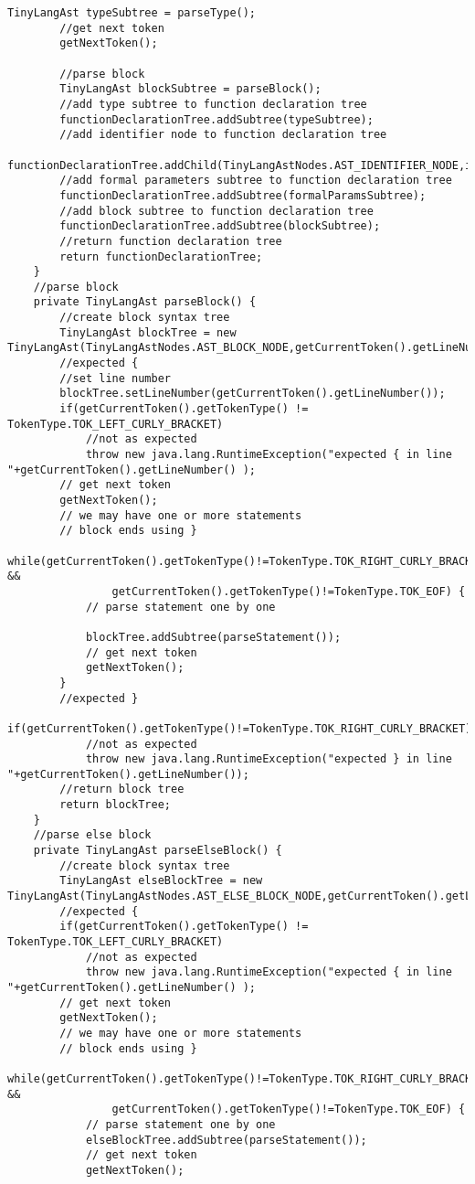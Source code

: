 \begin{lstlisting}[basicstyle=\miniscule,caption=Implementation of recursive descent parser,label=listing:rescursive descent parser implementation]
		TinyLangAst typeSubtree = parseType();
		//get next token
		getNextToken();

		//parse block
		TinyLangAst blockSubtree = parseBlock();
		//add type subtree to function declaration tree
		functionDeclarationTree.addSubtree(typeSubtree);
		//add identifier node to function declaration tree
		functionDeclarationTree.addChild(TinyLangAstNodes.AST_IDENTIFIER_NODE,identifier.getLexeme(),identifier.getLineNumber());
		//add formal parameters subtree to function declaration tree
		functionDeclarationTree.addSubtree(formalParamsSubtree);
		//add block subtree to function declaration tree
		functionDeclarationTree.addSubtree(blockSubtree);
		//return function declaration tree
		return functionDeclarationTree;
	}
	//parse block
	private TinyLangAst parseBlock() {
		//create block syntax tree
		TinyLangAst blockTree = new TinyLangAst(TinyLangAstNodes.AST_BLOCK_NODE,getCurrentToken().getLineNumber());
		//expected {
		//set line number 
		blockTree.setLineNumber(getCurrentToken().getLineNumber());
		if(getCurrentToken().getTokenType() != TokenType.TOK_LEFT_CURLY_BRACKET) 
			//not as expected
			throw new java.lang.RuntimeException("expected { in line "+getCurrentToken().getLineNumber() );
		// get next token
		getNextToken();
		// we may have one or more statements
		// block ends using }
		while(getCurrentToken().getTokenType()!=TokenType.TOK_RIGHT_CURLY_BRACKET &&
				getCurrentToken().getTokenType()!=TokenType.TOK_EOF) {
			// parse statement one by one

			blockTree.addSubtree(parseStatement());
			// get next token
			getNextToken();
		}
		//expected }
		if(getCurrentToken().getTokenType()!=TokenType.TOK_RIGHT_CURLY_BRACKET) 
			//not as expected
			throw new java.lang.RuntimeException("expected } in line "+getCurrentToken().getLineNumber());
		//return block tree
		return blockTree;
	}
	//parse else block
	private TinyLangAst parseElseBlock() {
		//create block syntax tree
		TinyLangAst elseBlockTree = new TinyLangAst(TinyLangAstNodes.AST_ELSE_BLOCK_NODE,getCurrentToken().getLineNumber());
		//expected {
		if(getCurrentToken().getTokenType() != TokenType.TOK_LEFT_CURLY_BRACKET) 
			//not as expected
			throw new java.lang.RuntimeException("expected { in line "+getCurrentToken().getLineNumber() );
		// get next token
		getNextToken();
		// we may have one or more statements
		// block ends using }
		while(getCurrentToken().getTokenType()!=TokenType.TOK_RIGHT_CURLY_BRACKET &&
				getCurrentToken().getTokenType()!=TokenType.TOK_EOF) {
			// parse statement one by one
			elseBlockTree.addSubtree(parseStatement());
			// get next token
			getNextToken();


\end{lstlisting}
